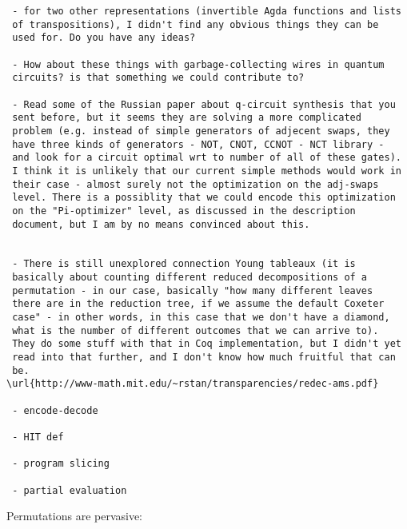 \documentclass{article}
\begin{document}
\begin{verbatim}
 - for two other representations (invertible Agda functions and lists
 of transpositions), I didn't find any obvious things they can be
 used for. Do you have any ideas?

 - How about these things with garbage-collecting wires in quantum
 circuits? is that something we could contribute to? 

 - Read some of the Russian paper about q-circuit synthesis that you
 sent before, but it seems they are solving a more complicated
 problem (e.g. instead of simple generators of adjecent swaps, they
 have three kinds of generators - NOT, CNOT, CCNOT - NCT library -
 and look for a circuit optimal wrt to number of all of these gates).
 I think it is unlikely that our current simple methods would work in
 their case - almost surely not the optimization on the adj-swaps
 level. There is a possiblity that we could encode this optimization
 on the "Pi-optimizer" level, as discussed in the description
 document, but I am by no means convinced about this.


 - There is still unexplored connection Young tableaux (it is
 basically about counting different reduced decompositions of a
 permutation - in our case, basically "how many different leaves
 there are in the reduction tree, if we assume the default Coxeter
 case" - in other words, in this case that we don't have a diamond,
 what is the number of different outcomes that we can arrive to).
 They do some stuff with that in Coq implementation, but I didn't yet
 read into that further, and I don't know how much fruitful that can
 be.  
\url{http://www-math.mit.edu/~rstan/transparencies/redec-ams.pdf}

 - encode-decode

 - HIT def

 - program slicing

 - partial evaluation

 \end{verbatim}

Permutations are pervasive:
\end{document}
